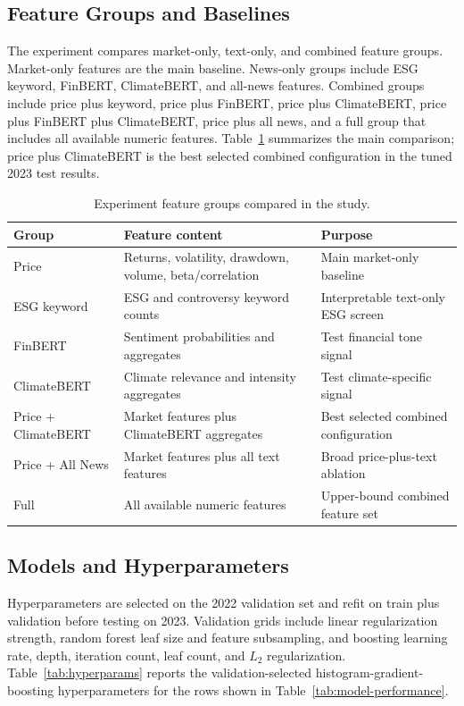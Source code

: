\documentclass[sigconf,nonacm]{acmart}
\begin{document}
\subsection{Feature Groups and Baselines}
The experiment compares market-only, text-only, and combined feature groups. Market-only features are the main baseline. News-only groups include ESG keyword, FinBERT, ClimateBERT, and all-news features. Combined groups include price plus keyword, price plus FinBERT, price plus ClimateBERT, price plus FinBERT plus ClimateBERT, price plus all news, and a full group that includes all available numeric features. Table~\ref{tab:experiment-matrix} summarizes the main comparison; price plus ClimateBERT is the best selected combined configuration in the tuned 2023 test results.

\begin{table}[t]
  \caption{Experiment feature groups compared in the study.}
  \label{tab:experiment-matrix}
  \centering
  \small
  \setlength{\tabcolsep}{4pt}
  \begin{tabularx}{\textwidth}{@{}>{\raggedright\arraybackslash}p{}X>{\raggedright\arraybackslash}p{}@{}}
    \toprule
    Group & Feature content & Purpose \\
    \midrule
    Price & Returns, volatility, drawdown, volume, beta/correlation & Main market-only baseline \\
    ESG keyword & ESG and controversy keyword counts & Interpretable text-only ESG screen \\
    FinBERT & Sentiment probabilities and aggregates & Test financial tone signal \\
    ClimateBERT & Climate relevance and intensity aggregates & Test climate-specific signal \\
    Price + ClimateBERT & Market features plus ClimateBERT aggregates & Best selected combined configuration \\
    Price + All News & Market features plus all text features & Broad price-plus-text ablation \\
    Full & All available numeric features & Upper-bound combined feature set \\
    \bottomrule
  \end{tabularx}
\end{table}

\subsection{Models and Hyperparameters}
Hyperparameters are selected on the 2022 validation set and refit on train plus validation before testing on 2023. Validation grids include linear regularization strength, random forest leaf size and feature subsampling, and boosting learning rate, depth, iteration count, leaf count, and $L_2$ regularization. Table~\ref{tab:hyperparams} reports the validation-selected histogram-gradient-boosting hyperparameters for the rows shown in Table~\ref{tab:model-performance}.
\end{document}
